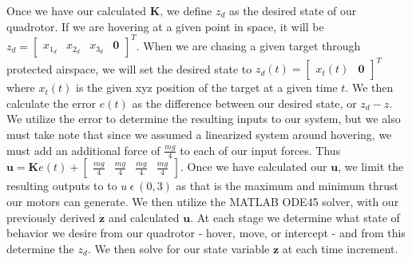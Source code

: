 \documentclass{article}
\begin{document}
\begin{multicols}{2}
Once we have our calculated $\boldsymbol{K}$, we define $z_d$ as the desired state of our quadrotor. If we are hovering  
at a given point in space, it will be $z_d=\begin{bmatrix} x_{1_d} & x_{2_d} & x_{3_d} & \boldsymbol{0} 
\end{bmatrix}^T$. When we are chasing a given target through protected airspace, we will set the desired state to 
$z_d(t)=\begin{bmatrix} x_t(t) & \boldsymbol{0} \end{bmatrix}^T$ where $x_t(t)$ is the given xyz position of the target at a given 
time $t$. We then calculate the error $e(t)$ as the difference between our desired state, or $z_d - z$. We utilize the error to 
determine the resulting inputs to our system, but we also must take note that since we assumed a linearized system around 
hovering, we must add an additional force of $\frac{mg}{4}$ to each of our input forces. Thus $\boldsymbol{u}= \boldsymbol{K}e(t) + 
\begin{bmatrix}\frac{mg}{4} & \frac{mg}{4} & \frac{mg}{4} & \frac{mg}{4}\end{bmatrix}$. 
Once we have calculated our $\boldsymbol{u}$, we limit the resulting outputs to to $u\  \epsilon\  (0, 3)$ as that is the maximum and minimum thrust our motors can generate. We then utilize the MATLAB ODE45 solver, with our previously derived $\boldsymbol{\dot{z}}$ and calculated $\boldsymbol{u}$. At each stage we determine what state of behavior we desire from our quadrotor - hover, move, or intercept - and from this determine the $z_d$. We then solve for our state variable $\boldsymbol{z}$ at each time increment.


\end{multicols}
\end{document}
